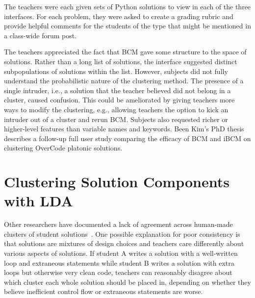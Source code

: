 The teachers were each given sets of Python solutions to view in each of the three interfaces. For each problem, they were asked to create a grading rubric and provide helpful comments for the students of the type that might be mentioned in a class-wide forum post.



The teachers appreciated the fact that BCM gave some structure to the space of solutions. Rather than a long list of solutions, the interface suggested distinct subpopulations of solutions within the list. However, subjects did not fully understand the probabilistic nature of the clustering method. The presence of a single intruder, i.e., a solution that the teacher believed did not belong in a cluster, caused confusion. This could be ameliorated by giving teachers more ways to modify the clustering, e.g., allowing teachers the option to kick an intruder out of a cluster and rerun BCM. Subjects also requested richer or higher-level features than variable names and keywords. Been Kim's PhD thesis~\cite{beenthesis} describes a follow-up full user study comparing the efficacy of BCM and iBCM on clustering OverCode platonic solutions. 

\section{Clustering Solution Components with LDA}

Other researchers have documented a lack of agreement across human-made clusters of student solutions~\cite{berkeleymastersthesis}. One possible explanation for poor consistency is that solutions are mixtures of design choices and teachers care differently about various aspects of solutions. If student A writes a solution with a well-written loop and extraneous statements while student B writes a solution with extra loops but otherwise very clean code, teachers can reasonably disagree about which cluster each whole solution should be placed in, depending on whether they believe inefficient control flow or extraneous statements are worse.

